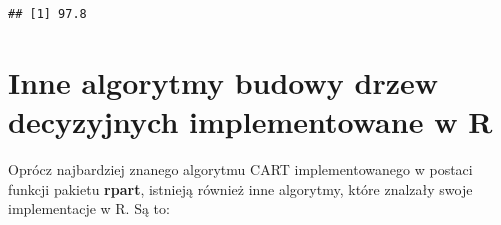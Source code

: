 \documentclass[]{book}
\theoremstyle{plain}
\theoremstyle{definition}
\begin{document}
\begin{verbatim}
## [1] 97.8
\end{verbatim}

\hypertarget{inne-algorytmy-budowy-drzew-decyzyjnych-implementowane-w-r}{%
\section{\texorpdfstring{Inne algorytmy budowy drzew decyzyjnych implementowane w \textbf{R}}{Inne algorytmy budowy drzew decyzyjnych implementowane w R}}\label{inne-algorytmy-budowy-drzew-decyzyjnych-implementowane-w-r}}

Oprócz najbardziej znanego algorytmu CART implementowanego w postaci funkcji pakietu \textbf{rpart}, istnieją również inne algorytmy, które znalzały swoje implementacje w R. Są to:
\end{document}
